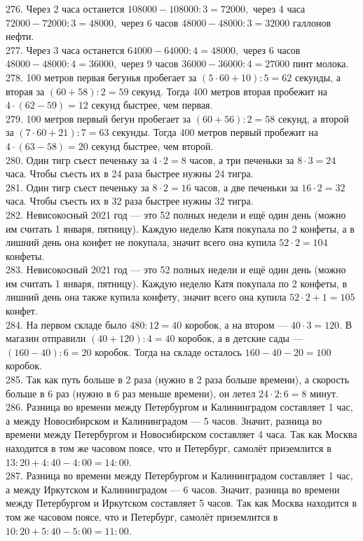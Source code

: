 \documentclass[12pt]{article}
\begin{document}
276. Через 2 часа останется $108000-108000:3=72000,$ через 4 часа $72000-72000:3=48000,$ через 6 часов $48000-48000:3=32000$ галлонов нефти.\\
277. Через 3 часа останется $64000-64000:4=48000,$ через 6 часов $48000-48000:4=36000,$ через 9 часов $36000-36000:4=27000$ пинт молока.\\
278. 100 метров первая бегунья пробегает за $(5\cdot60+10):5=62$ секунды, а вторая за $(60+58):2=59$ секунд. Тогда 400 метров вторая пробежит на $4\cdot(62-59)=12$ секунд быстрее, чем первая.\\
279. 100 метров первый бегун пробегает за $(60+56):2=58$ секунд, а второй за $(7\cdot60+21):7=63$ секунды. Тогда 400 метров первый пробежит на $4\cdot(63-58)=20$ секунд быстрее, чем второй.\\
280. Один тигр съест печеньку за $4\cdot2=8$ часов, а три печеньки за $8\cdot3=24$ часа. Чтобы съесть их в 24 раза быстрее нужны 24 тигра.\\
281. Один тигр съест печеньку за $8\cdot2=16$ часов, а две печеньки за $16\cdot2=32$ часа. Чтобы съесть их в 32 раза быстрее нужны 32 тигра.\\
282. Невисокосный 2021 год --- это 52 полных недели и ещё один день (можно им считать 1 января, пятницу). Каждую неделю Катя покупала по 2 конфеты, а в лишний день она конфет не покупала, значит всего она купила $52\cdot2=104$ конфеты.\\
283. Невисокосный 2021 год --- это 52 полных недели и ещё один день (можно им считать 1 января, пятницу). Каждую неделю Катя покупала по 2 конфеты, в лишний день она также купила конфету, значит всего она купила $52\cdot2+1=105$ конфет.\\
284. На первом складе было $480:12=40$ коробок, а на втором --- $40\cdot3=120.$ В магазин отправили $(40+120):4=40$ коробок, а в детские сады --- $(160-40):6=20$ коробок. Тогда на складе осталось $160-40-20=100$ коробок.\\
285. Так как путь больше в 2 раза (нужно в 2 раза больше времени), а скорость больше в 6 раз (нужно в 6 раз меньше времени), он летел $24\cdot2:6=8$ минут.\\
286. Разница во времени между Петербургом и Калининградом составляет 1 час, а между Новосибирском и Калининградом --- 5 часов. Значит, разница во времени между Петербургом и Новосибирском составляет 4 часа. Так как Москва находится в том же часовом поясе, что и Петербург, самолёт приземлится в $13:20+4:40-4:00=14:00.$\\
287. Разница во времени между Петербургом и Калининградом составляет 1 час, а между Иркутском и Калининградом --- 6 часов. Значит, разница во времени между Петербургом и Иркутском составляет 5 часов. Так как Москва находится в том же часовом поясе, что и Петербург, самолёт приземлится в $10:20+5:40-5:00=11:00.$\\
\end{document}

